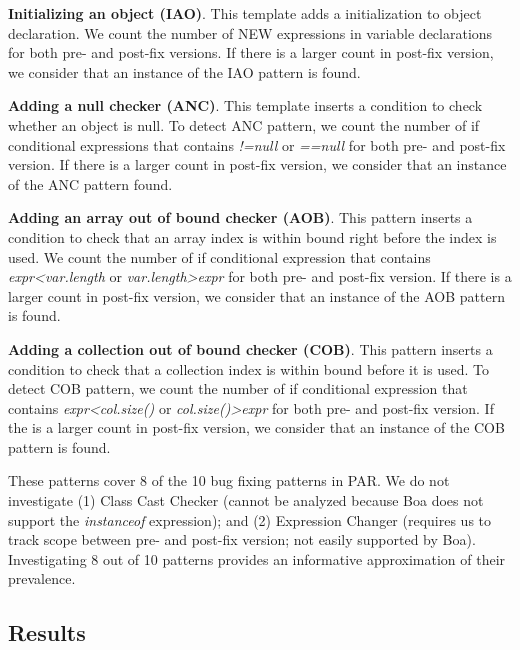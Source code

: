 \documentclass{sig-alternate-05-2015}
\begin{document}
\noindent
{\bf Initializing an object (IAO)}. This template adds a initialization to object
declaration.  We count the number of NEW expressions in variable declarations
for both pre- and post-fix versions. If there is a larger count in post-fix
version, we consider that an instance of the IAO pattern is found.

\noindent
 {\bf Adding a null checker (ANC)}.  This template inserts a condition to check whether an
    object is null.
  To detect ANC pattern, we count the number of if conditional expressions that
  contains {\em !=null} or {\em ==null} for both pre- and post-fix
  version. If there is a larger count in post-fix version,
  we consider that an instance of the ANC pattern found.

\noindent
 {\bf Adding an array out of bound checker (AOB)}. This pattern inserts a condition to check that an array
    index is within bound right before the index is used.
 We count the number of if conditional expression that
  contains {\em expr<var.length} or {\em var.length>expr} for both pre- and
  post-fix version. If there is a larger count in post-fix version, we consider that an instance of the AOB pattern is found.

\noindent
 {\bf Adding a collection out of bound checker (COB)}.  This pattern inserts a condition to check that a
    collection index is within bound before it is used.
To detect COB pattern, we count the number of if conditional expression that
contains {\em expr<col.size()} or {\em col.size()>expr} for both pre- and
post-fix version. If the is a larger count in post-fix
version, we consider that an instance of the COB pattern is found.

These patterns cover 8 of the 10 bug fixing patterns in
PAR. We do not investigate (1) Class Cast Checker (cannot be analyzed because
Boa does not support the {\em instanceof} expression); and (2) Expression Changer (requires us to track scope between pre- and post-fix version; not
easily supported by Boa). Investigating 8 out of
10 patterns provides an informative approximation of their prevalence.

\subsection{Results} \label{sec:freqfixpattern}
\end{document}
